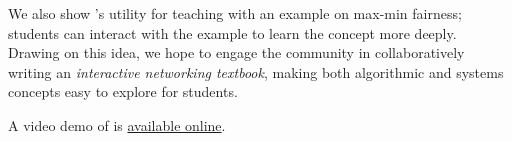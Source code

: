 We also show \sysname's utility for teaching with an example on max-min fairness; students can interact with the example to learn the concept more deeply. Drawing on this idea, we hope to engage the community in collaboratively writing an \textit{interactive networking textbook}, making both algorithmic and systems concepts easy to explore for students.

A video demo of \sysname is \href{https://drive.google.com/file/d/1f8gu3MpWzXM4WbpFLy7DXDcR4z3s6Ws9/view}{available online}.
